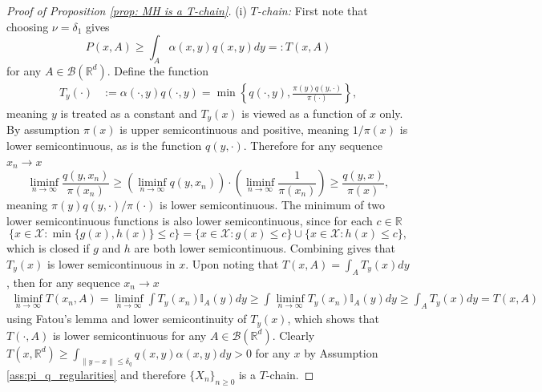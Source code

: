 \documentclass{article}
\theoremstyle{definition}
\theoremstyle{plain}
\begin{document}
\begin{proof}[Proof of Proposition \ref{prop: MH is a T-chain}]
(i) \textit{$T$-chain:} First note that choosing $\nu = \delta_1$ gives 
\begin{equation*}
    P(x,A) \ge\int_A \alpha(x,y)q(x,y)dy =: T(x,A)
\end{equation*}
for any $A \in \mathcal{B}(\mathbb{R}^d)$. Define the function
\begin{align}
    T_y(\cdot) &:= \alpha(\cdot,y)q(\cdot,y) = \min\left\{q(\cdot,y),\frac{\pi(y)q(y,\cdot)}{\pi(\cdot)}\right\},
\end{align}
meaning $y$ is treated as a constant and $T_y(x)$ is viewed as a function of $x$ only.  By assumption $\pi(x)$ is upper semicontinuous and positive, meaning $1/\pi(x)$ is lower semicontinuous, as is the function $q(y,\cdot)$. Therefore for any sequence $x_n\to x$
$$
\liminf_{n\to\infty} \frac{q(y,x_n)}{\pi(x_n)}\ge \left( \liminf_{n\to\infty} q(y,x_n)\right) \cdot \left( \liminf_{n\to\infty} \frac{1}{\pi(x_n)}\right)\ge \frac{q(y,x)}{\pi(x)},
$$
meaning $\pi(y) q(y,\cdot)/\pi(\cdot)$ is lower semicontinuous.  The minimum of two lower semicontinuous functions is also lower semicontinuous, since for each $c \in \mathbb{R}$
$$
\{x\in \mathcal{X}:\min\{g(x),h(x)\}\le c\} =\{x\in \mathcal{X}:g(x)\le c\} \cup \{x\in \mathcal{X}:h(x)\le c\},
$$
which is closed if $g$ and $h$ are both lower semicontinuous. Combining gives that $T_y(x)$ is lower semicontinuous in $x$.  Upon noting that $T(x,A) = \int_A T_y(x) dy$, then for any sequence $x_n\to x$
\begin{align}
    \liminf_{n\to\infty} T(x_n,A) = \liminf_{n\to\infty}  \int T_y(x_n)\mathbb{I}_A(y)dy
    \ge   \int \liminf_{n\to\infty} T_y(x_n)\mathbb{I}_A(y)dy
    \ge \int_A T_y(x)dy  = T(x,A)
\end{align}
using Fatou's lemma and lower semicontinuity of $T_y(x)$, which shows that $T(\cdot, A)$ is lower semicontinuous for any $A \in \mathcal{B}(\mathbb{R}^d)$. Clearly $T(x,\mathbb{R}^d) \geq \int_{\|y-x\|\leq \delta_q}q(x,y)\alpha(x,y)dy > 0$ for any $x$ by Assumption \ref{ass:pi_q_regularities} and therefore $\{X_n\}_{n\geq 0}$ is a $T$-chain.


\end{proof}
\end{document}
